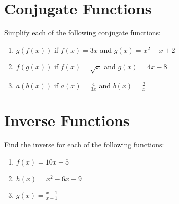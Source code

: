 \documentclass[12pt]{extarticle}
\begin{document}
\section{Conjugate Functions}
{Simplify each of the following conjugate functions:}
\begin{enumerate}
    \itemsep 2.0em
    \item {$g(f(x))$ if $f(x) = 3x$ and $g(x) = x^2 - x + 2$} %
    \item {$f(g(x))$ if $f(x) = \sqrt{x}$ and $g(x) = 4x - 8$} %
    \item {$a(b(x))$ if $a(x) = \frac{4}{3x}$ and $b(x) = \frac{2}{x}$} %
\end{enumerate}

\section{Inverse Functions}
{Find the inverse for each of the following functions:}
\begin{enumerate}
    \itemsep 2.0em
    \item {$f(x) = 10x - 5$} %
    \item {$h(x) = x^2 - 6x + 9$} %
    \item {$g(x) = \frac{x + 1}{x - 1}$} %
\end{enumerate}
\end{document}
